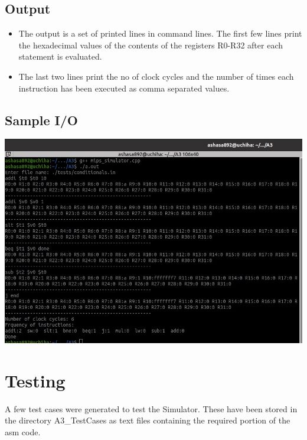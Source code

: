 \documentclass{article} %
\begin{document}
\subsection{Output}
\begin{itemize}
    \item The output is a set of printed lines in command lines. The first few lines print the hexadecimal values of the contents of the registers R0-R32 after each statement is evaluated.
    \item The last two lines print the no of clock cycles and the number of times each instruction has been executed as comma separated values.
\end{itemize}
\subsection{Sample I/O}
    \includegraphics[scale = 0.45]{sampleio_A3.JPG}

\section{Testing}
A few test cases were generated to test the Simulator. These have been stored in the directory A3\_TestCases as text files containing the required portion of the asm code.
\end{document}
